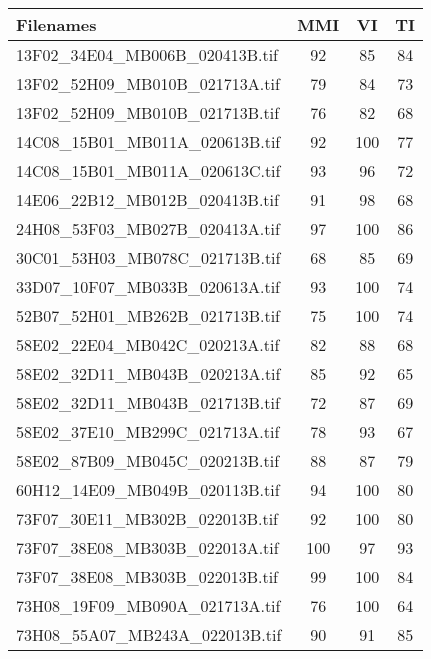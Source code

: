 \begin{tabular}{lccc}
\hline
 Filenames                                 & MMI & VI  & TI \\ \hline \hline
 13F02\_34E04\_MB006B\_020413B.tif & 92  & 85  & 84 \\
 13F02\_52H09\_MB010B\_021713A.tif & 79  & 84  & 73 \\
 13F02\_52H09\_MB010B\_021713B.tif & 76  & 82  & 68 \\
 14C08\_15B01\_MB011A\_020613B.tif & 92  & 100 & 77 \\
 14C08\_15B01\_MB011A\_020613C.tif & 93  & 96  & 72 \\
 14E06\_22B12\_MB012B\_020413B.tif & 91  & 98  & 68 \\
 24H08\_53F03\_MB027B\_020413A.tif & 97  & 100 & 86 \\
 30C01\_53H03\_MB078C\_021713B.tif & 68  & 85  & 69 \\
 33D07\_10F07\_MB033B\_020613A.tif & 93  & 100 & 74 \\
 52B07\_52H01\_MB262B\_021713B.tif & 75  & 100 & 74 \\
 58E02\_22E04\_MB042C\_020213A.tif & 82  & 88  & 68 \\
 58E02\_32D11\_MB043B\_020213A.tif & 85  & 92  & 65 \\
 58E02\_32D11\_MB043B\_021713B.tif & 72  & 87  & 69 \\
 58E02\_37E10\_MB299C\_021713A.tif & 78  & 93  & 67 \\
 58E02\_87B09\_MB045C\_020213B.tif & 88  & 87  & 79 \\
 60H12\_14E09\_MB049B\_020113B.tif & 94  & 100 & 80 \\
 73F07\_30E11\_MB302B\_022013B.tif & 92  & 100 & 80 \\
 73F07\_38E08\_MB303B\_022013A.tif & 100 & 97  & 93 \\
 73F07\_38E08\_MB303B\_022013B.tif & 99  & 100 & 84 \\
 73H08\_19F09\_MB090A\_021713A.tif & 76  & 100 & 64 \\
 73H08\_55A07\_MB243A\_022013B.tif & 90  & 91  & 85 \\
\hline
\end{tabular}
